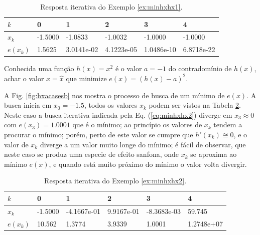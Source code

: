 \begin{table}[!h]
\centering
\begin{tabular}{|l|l|l|l|l|l|}
\hline
$k$      & 0 & 1 & 2 & 3 & 4 \\ \hline
$x_k$    & -1.5000 & -1.0833 & -1.0032 & -1.0000 & -1.0000 \\ \hline
$e(x_k)$ & 1.5625 & 3.0141e-02 & 4.1223e-05 & 1.0486e-10 & 6.8718e-22 \\ \hline
\end{tabular}
\caption{Resposta iterativa do Exemplo \ref{ex:minhxhx1}.}
\label{tab:hxacases1}
\end{table}

\begin{example}\label{ex:minhxhx2}
Conhecida uma função $h(x)=x^2$ é o valor $a=-1$ do contradomínio de $h(x)$,
achar o valor $x=\hat{x}$ que minimize $e(x)=(h(x)-a)^2$.
\end{example}


\begin{SolutionT}\label{sol:minhxhx2}
A Fig. \ref{fig:hxacasesb} nos mostra o processo de busca de um mínimo de $e(x)$. 
A busca inicia em $x_0=-1.5$,
 todos os valores $x_{k}$ podem ser vistos na Tabela \ref{tab:hxacases2}. 
Neste caso a busca iterativa indicada pela Eq. (\ref{eq:minhxhx2}) diverge 
em $x_3\approx 0$ com $e(x_3)=1.0001$ que é o mínimo;
ao princípio os valores de $x_{k}$ tendem a procurar o mínimo; porém,
perto de este valor se cumpre que $h'(x_{k})\cong 0$, e o valor de $x_{k}$ diverge
a um valor muito longe do mínimo; é fácil de observar, que neste caso se produz 
uma especie de efeito sanfona, onde $x_{k}$ se aproxima ao mínimo $e(x)$, e quando 
está muito próximo do mínimo o valor volta divergir.
\end{SolutionT}

\begin{table}[!h]
\centering
\begin{tabular}{|l|l|l|l|l|l|}
\hline
$k$      & 0 & 1 & 2 & 3 & 4 \\ \hline
$x_k$    & -1.5000 & -4.1667e-01 & 9.9167e-01 & -8.3683e-03 & 59.745 \\ \hline
$e(x_k)$ & 10.562 & 1.3774 & 3.9339 & 1.0001 & 1.2748e+07 \\ \hline
\end{tabular}
\caption{Resposta iterativa do Exemplo \ref{ex:minhxhx2}.}
\label{tab:hxacases2}
\end{table}


